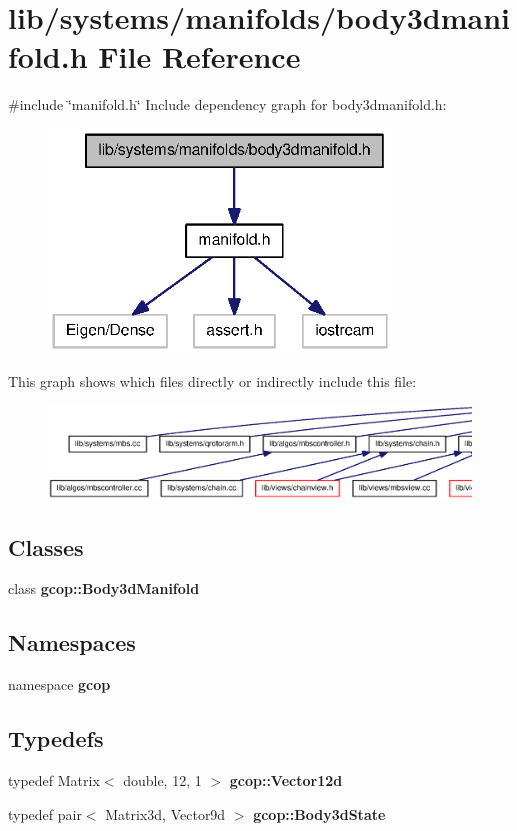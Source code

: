 \section{lib/systems/manifolds/body3dmanifold.h \-File \-Reference}
\label{body3dmanifold_8h}
{\ttfamily \#include \char`\"{}manifold.\-h\char`\"{}}\*
\-Include dependency graph for body3dmanifold.\-h\-:\nopagebreak
\begin{figure}[H]
\begin{center}
\leavevmode
\includegraphics[width=258pt]{body3dmanifold_8h__incl}
\end{center}
\end{figure}
\-This graph shows which files directly or indirectly include this file\-:
\nopagebreak
\begin{figure}[H]
\begin{center}
\leavevmode
\includegraphics[width=350pt]{body3dmanifold_8h__dep__incl}
\end{center}
\end{figure}
\subsection*{\-Classes}
\begin{DoxyCompactItemize}
\item 
class {\bf gcop\-::\-Body3d\-Manifold}
\end{DoxyCompactItemize}
\subsection*{\-Namespaces}
\begin{DoxyCompactItemize}
\item 
namespace {\bf gcop}
\end{DoxyCompactItemize}
\subsection*{\-Typedefs}
\begin{DoxyCompactItemize}
\item 
typedef \-Matrix$<$ double, 12, 1 $>$ {\bf gcop\-::\-Vector12d}
\item 
typedef pair$<$ \-Matrix3d, \-Vector9d $>$ {\bf gcop\-::\-Body3d\-State}
\end{DoxyCompactItemize}
